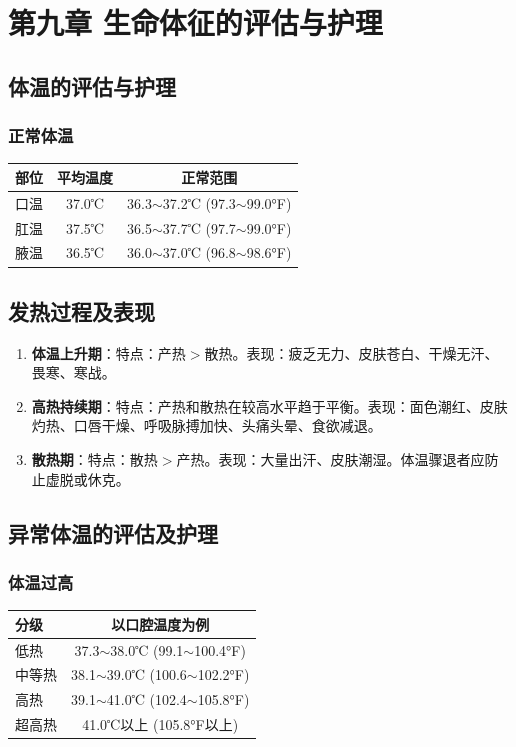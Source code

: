 \documentclass[11pt, a4paper]{ctexart}
\begin{document}
\section{第九章 生命体征的评估与护理}
\subsection{体温的评估与护理}
\subsubsection{正常体温}
\begin{table}[htbp]
	\centering
	\begin{tabular}{|l|c|c|}
		\hline
		\textbf{部位} & \textbf{平均温度} & \textbf{正常范围}                      \\
		\hline
		口温          & 37.0℃         & 36.3$\sim$37.2℃ (97.3$\sim$99.0°F) \\
		肛温          & 37.5℃         & 36.5$\sim$37.7℃ (97.7$\sim$99.0°F) \\
		腋温          & 36.5℃         & 36.0$\sim$37.0℃ (96.8$\sim$98.6°F) \\
		\hline
	\end{tabular}
\end{table}

\subsection{发热过程及表现}
\begin{enumerate}
	\item \textbf{体温上升期}：特点：产热$>$散热。表现：疲乏无力、皮肤苍白、干燥无汗、畏寒、寒战。
	\item \textbf{高热持续期}：特点：产热和散热在较高水平趋于平衡。表现：面色潮红、皮肤灼热、口唇干燥、呼吸脉搏加快、头痛头晕、食欲减退。
	\item \textbf{散热期}：特点：散热$>$产热。表现：大量出汗、皮肤潮湿。体温骤退者应防止虚脱或休克。
\end{enumerate}

\subsection{异常体温的评估及护理}
\subsubsection{体温过高}
\begin{table}[htbp]
	\centering
	\begin{tabular}{|l|c|}
		\hline
		\textbf{分级} & \textbf{以口腔温度为例}                     \\
		\hline
		低热          & 37.3$\sim$38.0℃ (99.1$\sim$100.4°F)  \\
		中等热         & 38.1$\sim$39.0℃ (100.6$\sim$102.2°F) \\
		高热          & 39.1$\sim$41.0℃ (102.4$\sim$105.8°F) \\
		超高热         & 41.0℃以上 (105.8°F以上)                  \\
		\hline
	\end{tabular}
\end{table}
\end{document}
